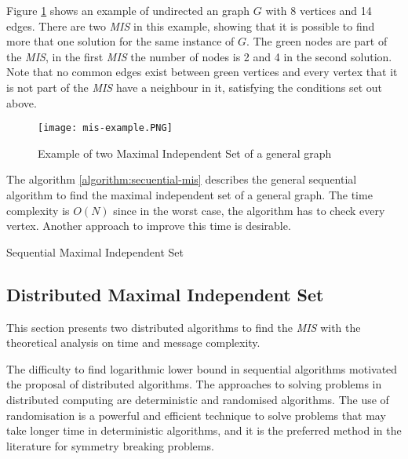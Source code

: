 Figure \ref{fig:graph1} shows an example of undirected an graph $G$ with 8 vertices and 14 edges. There are two \textit{MIS} in this example, showing that it is possible to find more that one solution for the same instance of $G$. The green nodes are part of the \textit{MIS}, in the first \textit{MIS} the number of nodes is 2 and 4 in the second solution. Note that no common edges exist between green vertices and every vertex that it is not part of the \textit{MIS} have a neighbour in it, satisfying the conditions set out above.
 
\begin{figure}[ht]
\centering
\texttt{[image: mis-example.PNG]} 
\caption{Example of two Maximal Independent Set of a general graph}
\label{fig:graph1}
\end{figure}



The algorithm \ref{algorithm:secuential-mis} describes the general sequential algorithm to find the maximal independent set of a general graph. The time complexity is $O(N)$ since in the worst case, the algorithm has to check every vertex. Another approach to improve this time is desirable. 



\begin{algorithm}
 \caption{Sequential Maximal Independent Set}
 \label{algorithm:secuential-mis} 

\SetAlgoNoLine
{}
    
 
\end{algorithm}
 
 
\subsection{Distributed Maximal Independent Set}

This section presents two distributed algorithms to find the \textit{MIS} with the theoretical analysis on time and message complexity. 

The difficulty to find logarithmic lower bound in sequential algorithms motivated the proposal of distributed algorithms.  The approaches to solving problems in distributed computing are deterministic and randomised algorithms.  The use of randomisation is a powerful and efficient technique to solve problems that may take longer time in deterministic algorithms, and it is the preferred method in the literature for symmetry breaking problems.

